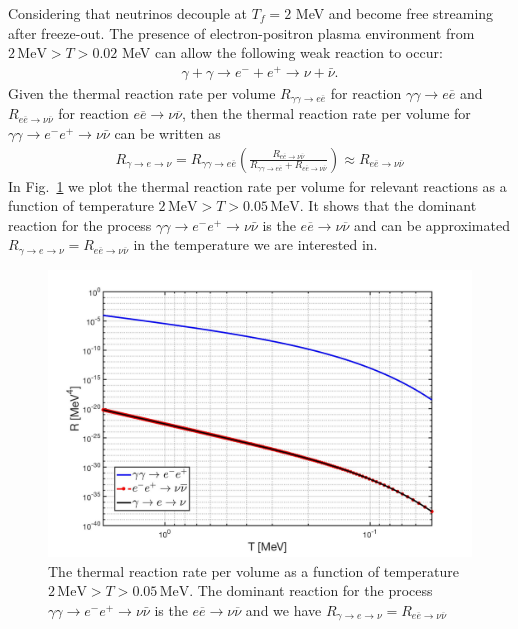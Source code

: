 Considering that neutrinos decouple at $T_f=2$ MeV and become free streaming after freeze-out. The presence of electron-positron plasma environment from $2\,\mathrm{MeV}>T>0.02$ MeV can allow the following weak reaction to occur:
\begin{align}
\gamma+\gamma\longrightarrow e^-+e^+\longrightarrow \nu+\bar{\nu}.
\end{align}
Given the  thermal reaction rate per volume $R_{\gamma\gamma\to e\overline{e}}$ for reaction $\gamma\gamma\to e\overline{e}$ and $R_{e\overline{e}\to\nu\overline{\nu}}$ for reaction $e\overline{e}\to\nu\overline{\nu}$, then the thermal reaction rate per volume for $\gamma\gamma\to e^-e^+\to\nu\bar{\nu}$ can be written as
\begin{align}
R_{\gamma\to e\to\nu}=R_{\gamma\gamma\to e\overline{e}}\left(\frac{R_{e\overline{e}\to\nu\overline{\nu}}}{R_{\gamma\gamma\to e\overline{e}}+R_{e\overline{e}\to\nu\overline{\nu}}}\right)\approx R_{e\overline{e}\to\nu\overline{\nu}}
\end{align}
In Fig.~\ref{ExtraNeutrinoRate} we plot the thermal reaction rate per volume for relevant reactions as a function of temperature $2\,\mathrm{MeV}>T>0.05\,\mathrm{MeV}$. It shows that the dominant reaction for the process $\gamma\gamma\to e^-e^+\to\nu\bar{\nu}$ is the $e\overline{e}\to\nu\overline{\nu}$ and can be approximated $R_{\gamma\to e\to\nu}=R_{e\overline{e}\to\nu\overline{\nu}}$ in the temperature we are interested in.
\begin{figure}[ht]
\begin{center}
\includegraphics[width=\textwidth]{./plots/Extra_neutrino_rate_volume}
\caption{The thermal reaction rate per volume as a function of temperature $2\,\mathrm{MeV}>T>0.05\,\mathrm{MeV}$. The dominant reaction for the process $\gamma\gamma\to e^-e^+\to\nu\bar{\nu}$ is the $e\overline{e}\to\nu\overline{\nu}$ and we have $R_{\gamma\to e\to\nu}=R_{e\overline{e}\to\nu\overline{\nu}}$}
\label{ExtraNeutrinoRate}
\end{center}
\end{figure}

